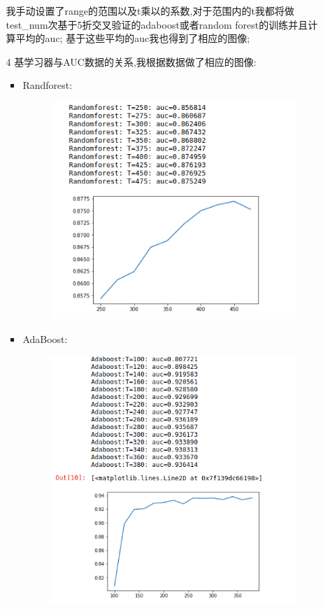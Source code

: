 \documentclass[11pt, a4paper, UTF8]{ctexart}
\begin{document}
\begin{solution}
\begin{enumerate}
\begin{enumerate}
我手动设置了range的范围以及t乘以的系数,对于范围内的t我都将做test\_num次基于5折交叉验证的adaboost或者random forest的训练并且计算平均的auc;
基于这些平均的auc我也得到了相应的图像;
\item[4] 基学习器与AUC数据的关系,我根据数据做了相应的图像:
\begin{itemize}
	\item Randforest: 
	\begin{figure}[!htbp]
		\centering
		\includegraphics[scale=0.60]{randresult.png}
	\end{figure}
	\item AdaBoost:
	\begin{figure}[!htbp]
		\centering
		\includegraphics[scale=0.60]{adaboostresult3.png}

\end{figure}
\end{itemize}
\end{enumerate}
\end{enumerate}
\end{solution}
\end{document}
